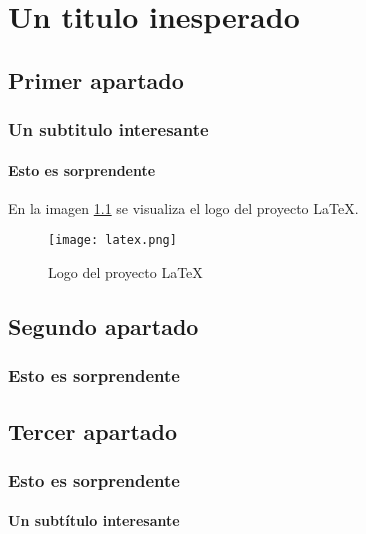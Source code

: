 
\chapter{Un titulo inesperado}
\section{Primer apartado}
   \lipsum[4-5]
\subsection{Un subtitulo interesante}
   \lipsum[6]
\subsubsection{Esto es sorprendente}
   \lipsum[2-3]
   En la imagen \ref{fig:proyecto_latex} se visualiza el logo del proyecto \LaTeX.

\begin{figure}[ht]
   \centering
   \texttt{[image: latex.png]}
   \caption{Logo del proyecto \LaTeX}
   \label{fig:proyecto_latex}
\end{figure}
\section{Segundo apartado}
   \lipsum[1]
   \subsection{Esto es sorprendente}
   \lipsum[2]
\section{Tercer apartado}
\subsection{Esto es sorprendente}
\lipsum[3-4]
\subsubsection{Un subtítulo interesante}
\lipsum[5-7]

